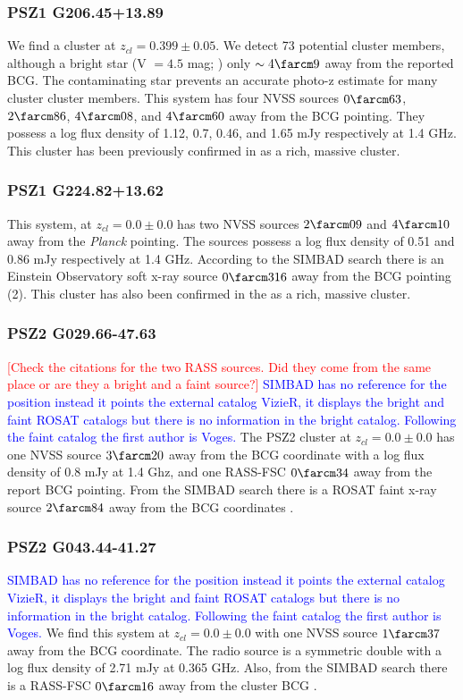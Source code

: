 \documentclass[apj, revtex4-1]{emulateapj}
\newcommand{\editorial}[1]{\textcolor{red}{#1}}
\newcommand{\peditorial}[1]{\textcolor{blue}{#1}}
\begin{document}
\subsubsection{PSZ1 G206.45+13.89}
We find a cluster at $z_{cl} = 0.399 \pm 0.05$. We detect 73 potential cluster members, although a bright star (V $= 4.5$ mag; \citealt{Hog2000}) only $\sim4\farcm9$ away from the reported BCG. The contaminating star prevents an accurate photo-z estimate for many cluster cluster members. This system has four NVSS sources $0\farcm63$, $2\farcm86$, $4\farcm08$, and $4\farcm60$ away from the BCG pointing. They possess a log flux density of 1.12, 0.7, 0.46, and 1.65 mJy respectively at 1.4 GHz. This cluster has been previously confirmed in \citep{Barrena2018} as a rich, massive cluster. 

\subsubsection{PSZ1 G224.82+13.62}
This system, at $z_{cl} = 0.0 \pm 0.0$ has two NVSS sources $2\farcm09$ and $4\farcm10$ away from the \textit{Planck} pointing. The sources possess a log flux density of 0.51 and 0.86 mJy respectively at 1.4 GHz. According to the SIMBAD search there is an Einstein Observatory soft x-ray source $0\farcm316$ away from the BCG pointing (2). This cluster has also been confirmed in the \citep{Barrena2018} as a rich, massive cluster.

\subsubsection{PSZ2 G029.66-47.63}
\editorial{[Check the citations for the two RASS sources. Did they come from the same place or are they a bright and a faint source?]}
\peditorial{SIMBAD has no reference for the position instead it points the external catalog VizieR, it displays the bright and faint ROSAT catalogs but there is no information in the bright catalog. Following the faint catalog the first author is Voges.}
The PSZ2 cluster at $z_{cl} = 0.0 \pm 0.0$ has one NVSS source $3\farcm20$ away from the BCG coordinate with a log flux density of 0.8 mJy at 1.4 Ghz, and one RASS-FSC $0\farcm34$ away from the report BCG pointing. From the SIMBAD search there is a ROSAT faint x-ray source $2\farcm84$ away from the BCG coordinates \citep{Bohringer2000}.


\subsubsection{PSZ2 G043.44-41.27}
\peditorial{SIMBAD has no reference for the position instead it points the external catalog VizieR, it displays the bright and faint ROSAT catalogs but there is no information in the bright catalog. Following the faint catalog the first author is Voges.}
We find this system at $z_{cl} = 0.0 \pm 0.0$ with one NVSS source $1\farcm37$ away from the BCG coordinate. The radio source is a symmetric double with a log flux density of 2.71 mJy at 0.365 GHz. Also, from the SIMBAD search there is a RASS-FSC $0\farcm16$ away from the cluster BCG \citep{Bohringer2000}.
\end{document}
